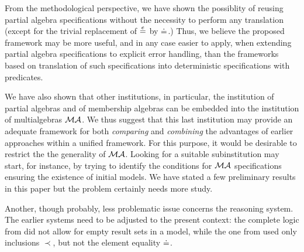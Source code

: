 \documentclass[10pt]{article}
\begin{document}
From the methodological perspective, we have shown the possiblity of
reusing partial algebra specifications without the necessity to perform any
translation (except for the trivial replacement of $\stackrel{e}{=}$ by $\mathrel{\dot{=} }$.) Thus,
we believe the proposed framework may be more useful, and in any case easier
to apply, when extending partial algebra specifications to explicit error
handling, than the frameworks based on translation of such specifications into
deterministic specifications with predicates.

We have also shown that other institutions, in particular, the institution of
partial algebras and of membership algebras can be embedded into the
institution of multialgebras ${\mathcal{MA}}$. We thus suggest that this last institution may
provide an adequate framework for both {\em comparing} and {\em combining} the advantages
of earlier approaches within a unified framework.
For this purpose, it would be desirable to restrict the 
the generality of ${\mathcal{MA}}$. Looking for a suitable subinstitution may
start, for instance, by trying to identify the conditions for ${\mathcal{MA}}$
specifications ensuring the existence of initial models. We have stated a few
preliminary results in this paper but the problem certainly needs more
study. 

Another, though probably, less problematic issue concerns the reasoning
system. The earlier systems need to be adjusted to the present context: the
complete logic from \cite{toplas,calc} did not allow for empty result sets in a model,
while the one from \cite{BK} used only inclusions $\prec$, but not the element
equality $\mathrel{\dot{=} }$.





\end{document}
